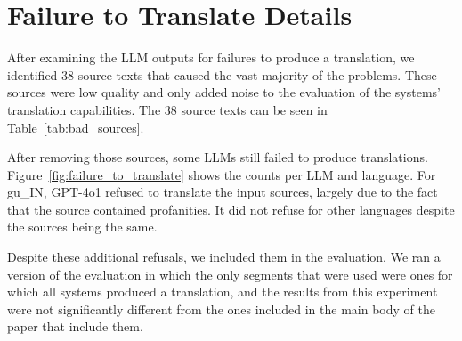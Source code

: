 \section{Failure to Translate Details}
\label{appendix:failure}


After examining the LLM outputs for failures to produce a translation, we identified 38 source texts that caused the vast majority of the problems.
These sources were low quality and only added noise to the evaluation of the systems' translation capabilities.
The 38 source texts can be seen in Table~\ref{tab:bad_sources}.

After removing those sources, some LLMs still failed to produce translations.
Figure~\ref{fig:failure_to_translate} shows the counts per LLM and language.
For gu\_IN, GPT-4o1 refused to translate the input sources, largely due to the fact that the source contained profanities.
It did not refuse for other languages despite the sources being the same.

Despite these additional refusals, we included them in the evaluation.
We ran a version of the evaluation in which the only segments that were used were ones for which all systems produced a translation, and the results from this experiment were not significantly different from the ones included in the main body of the paper that include them.
